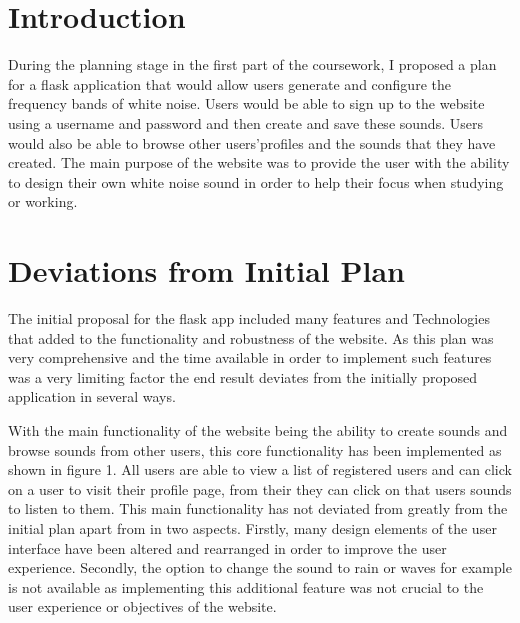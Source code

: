 \documentclass[10pt, a4paper]{article}
\title{\mytitle}
\author{\myauthor\hspace{1em}\\\contact\\Edinburgh Napier University\hspace{0.5em}-\hspace{0.5em}\mymodule}
\date{}
\begin{document}
    \maketitle





\section{Introduction}
During the planning stage in the first part of the coursework, I proposed a plan for a flask application that would allow users generate and configure the frequency bands of white noise. Users would be able to sign up to the website using a username and password and then create and save these sounds. Users would also be able to browse other users\rq \enspace profiles and the sounds that they have created. The main purpose of the website was to provide the user with the ability to design their own white noise sound in order to help their focus when studying or working.






\section{Deviations from Initial Plan}
The initial proposal for the flask app included many features and Technologies that added to the functionality and robustness of the website. As this plan was very comprehensive and the time available in order to implement such features was a very limiting factor the end result deviates from the initially proposed application in several ways.

With the main functionality of the website being the ability to create sounds and browse sounds from other users, this core functionality has been implemented as shown in figure 1. All users are able to view a list of registered users and can click on a user to visit their profile page, from their they can click on that users sounds to listen to them. This main functionality has not deviated from greatly from the initial plan apart from in two aspects. Firstly, many design elements of the user interface have been altered and rearranged in order to improve the user experience. Secondly, the option to change the sound to rain or waves for example is not available as implementing this additional feature was not crucial to the user experience or objectives of the website. 
\newpage
\end{document}
